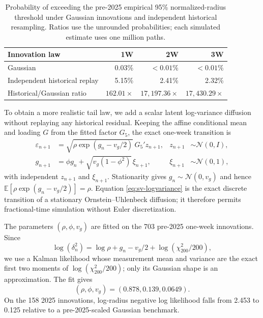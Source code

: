 \documentclass[11pt,a4paper]{article}
\newcommand{\E}{\mathbb{E}}
\begin{document}
\begin{table}[H]
\centering
\small
\begin{tabular}{lrrr}
\toprule
Innovation law & 1W & 2W & 3W\\
\midrule
Gaussian & 0.03\% & $<0.01\%$ & $<0.01\%$\\
Independent historical replay & 5.15\% & 2.41\% & 2.32\%\\
Historical/Gaussian ratio & $162.01\times$ & $17{,}197.36\times$
  & $17{,}430.29\times$\\
\bottomrule
\end{tabular}
\caption{Probability of exceeding the pre-2025 empirical 95\%
normalized-radius threshold under Gaussian innovations and independent
historical resampling.  Ratios use the unrounded probabilities; each simulated
estimate uses one million paths.}
\label{tab:gaussian-historical-tail-gap}
\end{table}

To obtain a more realistic tail law, we add a scalar latent log-variance
diffusion without replaying any historical residual.  Keeping the affine conditional mean and loading $G$
from the fitted factor $G_5$, the exact one-week transition is
\begin{align}
  \varepsilon_{n+1}
    &=\sqrt{\rho\exp(g_n-v_g/2)}\,G_5'z_{n+1},
      &z_{n+1}&\sim\mathcal N(0,I),\label{eq:sv-innovation}\\
  g_{n+1}
    &=\phi g_n+\sqrt{v_g(1-\phi^2)}\,\xi_{n+1},
      &\xi_{n+1}&\sim\mathcal N(0,1),\label{eq:sv-logvariance}
\end{align}
with independent $z_{n+1}$ and $\xi_{n+1}$.  Stationarity gives
$g_n\sim\mathcal N(0,v_g)$ and hence
$\E[\rho\exp(g_n-v_g/2)]=\rho$.  Equation
\eqref{eq:sv-logvariance} is the exact discrete transition of a stationary
Ornstein--Uhlenbeck diffusion; it therefore permits fractional-time simulation
without Euler discretization.

The parameters $(\rho,\phi,v_g)$ are fitted on the 703 pre-2025 one-week
innovations.  Since
\begin{equation}
  \log (\delta_n^2)
  =\log\rho+g_n-v_g/2+\log(\chi^2_{200}/200),
  \label{eq:sv-log-radius}
\end{equation}
we use a Kalman likelihood whose measurement mean and variance are the exact
first two moments of $\log(\chi^2_{200}/200)$; only its Gaussian shape is an
approximation.  The fit gives
\[
  (\rho,\phi,v_g)=(0.878,0.139,0.0649).
\]
On the 158 2025 innovations,
log-radius negative log likelihood falls from 2.453 to 0.125 relative to a
pre-2025-scaled Gaussian benchmark.
\end{document}
